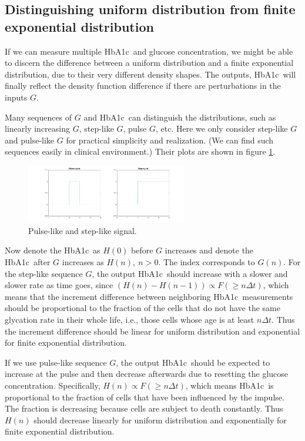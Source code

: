 \documentclass{article}
\newcommand{\hba}{\textrm{HbA1c}}
\begin{document}
\subsection{Distinguishing uniform distribution from finite exponential distribution}
If we can measure multiple \hba\ and glucose concentration, we might be able to discern the difference between a uniform distribution and a finite exponential distribution, due to their very different density shapes. The outputs, \hba\ will finally reflect the density function difference if there are perturbations in the inputs $G$.

Many sequences of $G$ and  \hba\ can distinguish the distributions, such as linearly increasing $G$, step-like $G$, pulse $G$, etc.  Here we only consider step-like $G$ and pulse-like $G$ for practical simplicity and realization. (We can find such sequences easily in clinical environment.) Their plots are shown in figure \ref{fig1}.
\begin{figure}[h]
  \centering
  \includegraphics[width=7cm]{fig/step_pulse.jpg}
  \caption{Pulse-like and step-like signal.}
  \label{fig1}
\end{figure}
Now denote the \hba\  as $H(0)$ before $G$ increases and denote the \hba\ after $G$ increases as $H(n),\ n > 0$. The index corresponds to $G(n)$. For the step-like sequence $G$, the output \hba\ should increase with a slower and slower rate as time goes, since $(H(n)-H(n-1)) \propto F(\geq n\Delta t)$, which means that the increment difference between neighboring \hba\ measurements should be proportional to the fraction of the cells that do not have the same glycation rate in their whole life, i.e., those cells whose age is at least $n\Delta t$. Thus the increment difference should be linear for uniform distribution and exponential for finite exponential distribution.

If we use pulse-like sequence $G$, the output \hba\ should be expected to increase at the pulse and then decrease afterwards due to resetting the glucose concentration. Specifically, $H(n)\propto F(\geq n\Delta t)$, which means \hba\ is proportional to the fraction of cells that have been influenced by the impulse. The fraction is decreasing because cells are subject to death constantly. Thus $H(n)$ should decrease linearly for uniform distribution and exponentially for finite exponential distribution.
\end{document}
